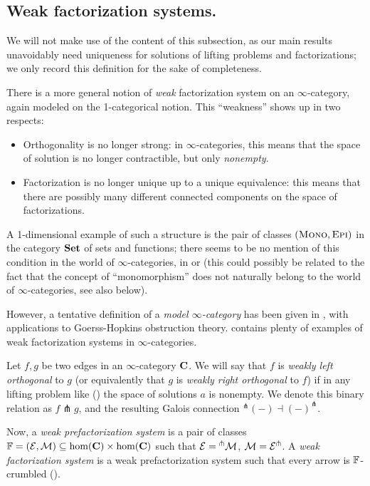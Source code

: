 \subsection{Weak factorization systems.}
We will not make use of the content of this subsection, as our main results unavoidably need uniqueness for solutions of lifting problems and factorizations; we only record this definition for the sake of completeness.

There is a more general notion of \emph{weak} factorization system on an $\infty$\hyp{}category, again modeled on the 1\hyp{}categorical notion. This ``weakness'' shows up in two respects:
\begin{itemize}
\item Orthogonality is no longer strong: in $\infty$\hyp{}categories, this means that the space of solution is no longer contractible, but only \emph{nonempty}.
\item Factorization is no longer unique up to a unique equivalence: this means that there are possibly many different connected components on the space of factorizations.
\end{itemize}
A 1\hyp{}dimensional example of such a structure is the pair of classes $(\text{\scshape Mono}, \text{\scshape Epi})$ in the category $\mathbf{Set}$ of sets and functions; there seems to be no mention of this condition in the world of $\infty$\hyp{}categories, in \cite{HTT} or \cite{Joy} (this could possibly be related to the fact that the concept of ``monomorphism'' does not naturally belong to the world of $\infty$\hyp{}categories, see also  below). 

However, a tentative definition of a \emph{model $\infty$\hyp{}category} has been given in \cite{Aaron}, with applications to Goerss\hyp{}Hopkins obstruction theory. \cite[\S\textbf{2}]{Aaron} contains plenty of examples of weak factorization systems in $\infty$\hyp{}categories.
\begin{definition}\label{weak.ortho}
Let $f,g$ be two edges in an $\infty$\hyp{}category $\mathbf{C}$. We will say that $f$ is \emph{weakly left orthogonal} to $g$ (or equivalently that $g$ is \emph{weakly right orthogonal} to $f$) if in any lifting problem like () 
the space of solutions $a$ is nonempty. We denote this binary relation as $f\pitchfork g$, and the resulting Galois connection ${}^\pitchfork(-)\dashv (-)^\pitchfork$.
\end{definition}
Now, a \emph{weak prefactorization system} is a pair of classes $\mathbb{F} = (\mathcal{E},\mathcal{M})\subseteq \text{hom}(\mathbf{C})\times \text{hom}(\mathbf{C})$ such that $\mathcal{E} = {}^\pitchfork\mathcal{M}$, $\mathcal{M} = \mathcal{E}^\pitchfork$. A \emph{weak factorization system} is a weak prefactorization system such that every arrow is $\mathbb{F}$\hyp{}crumbled (\adef {}).

